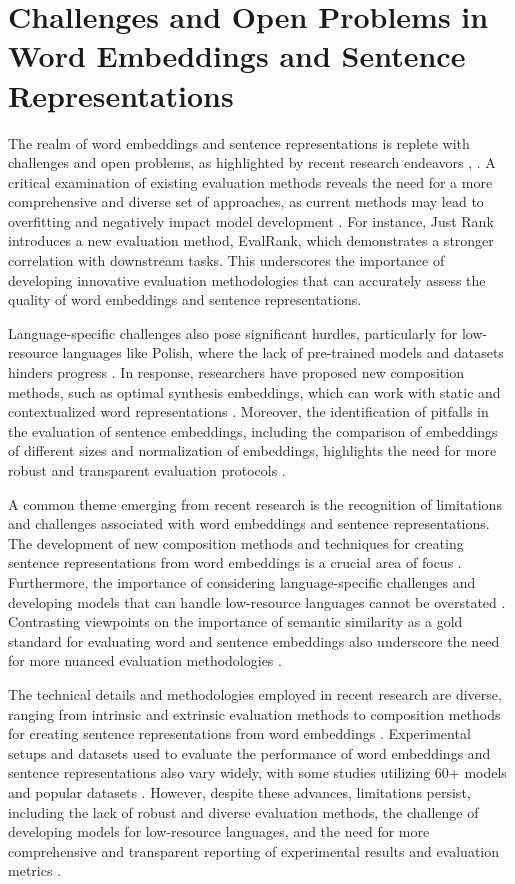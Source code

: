 \documentclass[conference]{IEEEtran}
\begin{document}
\section{Challenges and Open Problems in Word Embeddings and Sentence Representations}
The realm of word embeddings and sentence representations is replete with challenges and open problems, as highlighted by recent research endeavors \cite{b1}, \cite{b2}. A critical examination of existing evaluation methods reveals the need for a more comprehensive and diverse set of approaches, as current methods may lead to overfitting and negatively impact model development \cite{b3}. For instance, Just Rank \cite{b4} introduces a new evaluation method, EvalRank, which demonstrates a stronger correlation with downstream tasks. This underscores the importance of developing innovative evaluation methodologies that can accurately assess the quality of word embeddings and sentence representations.

Language-specific challenges also pose significant hurdles, particularly for low-resource languages like Polish, where the lack of pre-trained models and datasets hinders progress \cite{b5}. In response, researchers have proposed new composition methods, such as optimal synthesis embeddings, which can work with static and contextualized word representations \cite{b6}. Moreover, the identification of pitfalls in the evaluation of sentence embeddings, including the comparison of embeddings of different sizes and normalization of embeddings, highlights the need for more robust and transparent evaluation protocols \cite{b7}.

A common theme emerging from recent research is the recognition of limitations and challenges associated with word embeddings and sentence representations. The development of new composition methods and techniques for creating sentence representations from word embeddings is a crucial area of focus \cite{b8}. Furthermore, the importance of considering language-specific challenges and developing models that can handle low-resource languages cannot be overstated \cite{b9}. Contrasting viewpoints on the importance of semantic similarity as a gold standard for evaluating word and sentence embeddings also underscore the need for more nuanced evaluation methodologies \cite{b10}.

The technical details and methodologies employed in recent research are diverse, ranging from intrinsic and extrinsic evaluation methods to composition methods for creating sentence representations from word embeddings \cite{b11}. Experimental setups and datasets used to evaluate the performance of word embeddings and sentence representations also vary widely, with some studies utilizing 60+ models and popular datasets \cite{b12}. However, despite these advances, limitations persist, including the lack of robust and diverse evaluation methods, the challenge of developing models for low-resource languages, and the need for more comprehensive and transparent reporting of experimental results and evaluation metrics \cite{b13}.
\end{document}
